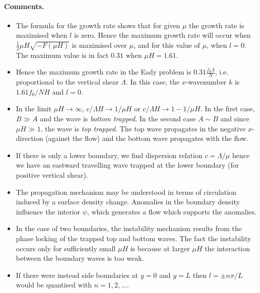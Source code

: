 \documentclass{jknotes}
\begin{document}
\paragraph{Comments.}
\begin{itemize}
	\item The formula for the growth rate shows that for given $\mu$ the
		growth rate is maximised when $l$ is zero. Hence the maximum growth
		rate will occur when $\frac{1}{2}\mu H \sqrt{-F(\mu H)}$ is maximised
		over $\mu$, and for this value of $\mu$, when $l = 0$. The maximum
		value is in fact $0.31$ when $\mu H = 1.61$.
	\item Hence the maximum growth rate in the Eady problem is $0.31 \frac{f_0
		\Lambda}{N}$, i.e. proportional to the vertical shear $\Lambda$. In
		this case, the $x$-wavenumber $k$ is $1.61 f_0/NH$ and $l = 0$.
	\item In the limit $\mu H \to \infty$, $c/\Lambda H \to 1/\mu H$ or
		$c/\Lambda H \to 1 - 1/\mu H$. In the first case, $B \gg A$ and the
		wave is \emph{bottom trapped}. In the second case $A \sim B$ and since
		$\mu H \gg 1$, the wave is \emph{top trapped}. The top wave propagates
		in the negative $x$-direction (against the flow) and the bottom wave
		propagates with the flow.
	\item If there is only a lower boundary, we find dispersion relation $c =
		\Lambda/\mu$ hence we have an eastward travelling wave trapped at the
		lower boundary (for positive vertical shear). 
	\item The propagation mechanism may be understood in terms of circulation
		induced by a surface density change. Anomalies in the boundary density
		influence the interior $\psi$, which generates a flow which supports
		the anomalies.
	\item In the case of two boundaries, the instability mechanism results
		from the phase locking of the trapped top and bottom waves. The fact
		the instability occurs only for sufficiently small $\mu H$ is because
		at larger $\mu H$ the interaction between the boundary waves is too
		weak.
	\item If there were instead side boundaries at $y = 0$ and $y = L$ then $l
		= \pm n \pi /L$ would be quantised with $n = 1, 2, \dots$. 
\end{itemize}
\end{document}
